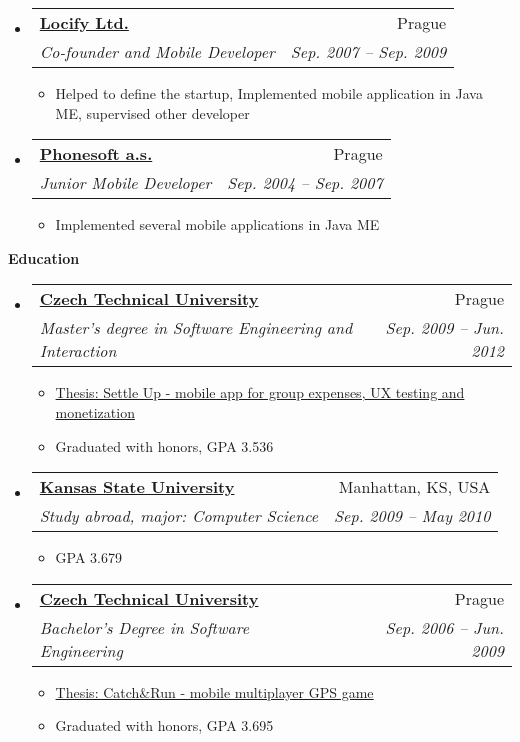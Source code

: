 \documentclass[letterpaper,11pt]{article}
\makeatletter
\newcommand{\resitem}[1]{\item #1 \vspace{-2pt}}
\newcommand{\resheading}[1]{{\large \colorbox{mygrey}{\begin{minipage}{\textwidth}{\textbf{#1 \vphantom{p\^{E}}}}\end{minipage}}}}
\newcommand{\ressubheading}[4]{
\begin{tabular*}{6.5in}{l@{\extracolsep{\fill}}r}
		\textbf{#1} & #2 \\
		\textit{#3} & \textit{#4} \\
\end{tabular*}\vspace{-6pt}}
\makeatother
\begin{document}
\begin{itemize}
		\item 
			\ressubheading{\href{http://www.locify.com}{Locify Ltd.}}{Prague}{Co-founder and Mobile Developer}{Sep. 2007 -- Sep. 2009}
				{ \footnotesize
				\begin{itemize}
					\resitem{Helped to define the startup, Implemented mobile application in Java ME, supervised other developer}
				\end{itemize}
				}
		\item
			\ressubheading{\href{http://www.phonesoft.cz}{Phonesoft a.s.}}{Prague}{Junior Mobile Developer}{Sep. 2004 -- Sep. 2007}
				{ \footnotesize
				\begin{itemize}
					\resitem{Implemented several mobile applications in Java ME}
				\end{itemize}
          			}

	\end{itemize}  %
	
	\newpage
\resheading{Education}
	\begin{itemize}
		\item
			\ressubheading{\href{http://www.cvut.cz/en?set_language=en}{Czech Technical University}}{Prague}{Master's degree in Software Engineering and Interaction}{Sep. 2009 -- Jun. 2012}
				{ \footnotesize
				\begin{itemize}
					\resitem{\href{http://www.settleup.info/files/master-thesis-david-vavra.pdf}{Thesis: Settle Up - mobile app for group expenses, UX testing and monetization}}
					\resitem{Graduated with honors, GPA 3.536}
				\end{itemize}
				}
		\item
			\ressubheading{\href{http://www.k-state.edu}{Kansas State University}}{Manhattan, KS, USA}{Study abroad, major: Computer Science}{Sep. 2009 -- May 2010}
{ \footnotesize
				\begin{itemize}
					\resitem{GPA 3.679}
				\end{itemize}
				}
		\item   															%
			\ressubheading{\href{http://www.cvut.cz/en?set_language=en}{Czech Technical University}}{Prague}{Bachelor's Degree in Software Engineering}{Sep. 2006 -- Jun. 2009}
				{ \footnotesize
				\begin{itemize}
					\resitem{\href{http://www.destil.cz/bachelor-thesis-david-vavra.pdf}{Thesis: Catch\&Run - mobile multiplayer GPS game}}
					\resitem{Graduated with honors, GPA 3.695}
				\end{itemize}
				}
	\end{itemize} %
	
\end{document}
